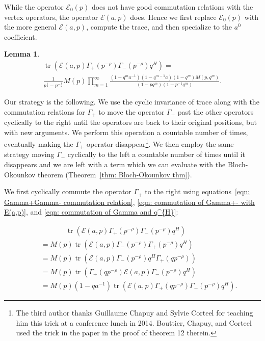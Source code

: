 \documentclass[12pt]{amsart}
\newcommand{\half}{\frac{1}{2}}
\newtheorem{lemma}[theorem]{Lemma}
\theoremstyle{definition}
\newcommand{\tr}{\operatorname{tr}}
\newcommand{\E}{\mathcal{E}}
\newcommand{\ptotheminusrho}{p^{-\rho}}
\begin{document}
While the operator $\E_{0}(p)$ does not have good commutation
relations with the vertex operators, the operator $\E (a,p)$
does. Hence we first replace $\E_{0}(p)$ with the more general $\E
(a,p)$, compute the trace, and then specialize to the $a^{0}$
coefficient.
\begin{lemma}\label{lem: trace of E Gamma+Gamma-q^{H}}
\begin{multline*}
\tr \left(\E (a,p)\Gamma_{+}(\ptotheminusrho )\Gamma_{-}(\ptotheminusrho )q^{H}
\right) = \\
\frac{1}{p^{\half}-p^{-\half}}M(p)\prod_{m=1}^{\infty}
\frac{(1-q^{m}a^{-1})(1-q^{m-1}a)(1-q^{m})
M(p,q^{m})}{(1-pq^{m})(1-p^{-1}q^{m})}.
\end{multline*}
\end{lemma}
\proof Our strategy is the following. We use the cyclic invariance of
trace along with the commutation relations for $\Gamma_{+}$ to move
the operator $\Gamma_{+}$ past the other operators cyclically to the
right until the operators are back to their original positions, but
with new arguments. We perform this operation a countable number of
times, eventually making the $\Gamma_{+}$ operator
disappear\footnote{The third author thanks Guillaume Chapuy and Sylvie
Corteel for teaching him this trick at a conference lunch in
2014. Bouttier, Chapuy, and Corteel used the trick in the paper
\cite{Bouttier-Chapuy-Corteel} in the proof of theorem 12
therein.}. We then employ the same strategy moving $\Gamma_{-}$
cyclically to the left a countable number of times until it disappears
and we are left with a term which we can evaluate with the
Bloch-Okounkov theorem (Theorem~\ref{thm: Bloch-Okounkov thm}).

We first cyclically commute the operator $\Gamma_{+}$ to the right
using equations~\eqref{eqn: Gamma+Gamma- commutation relation},
\eqref{eqn: commutation of Gamma+- with E(a,p)}, and \eqref{eqn:
commutation of Gamma and q^{H}}:

\begin{align*}
\quad &\quad \quad \quad \,\,\, \tr (\E (a,p)\Gamma_{+}(\ptotheminusrho)\Gamma_{-}(\ptotheminusrho
)q^{H})\\
& = M(p)\tr (\E (a,p)\Gamma_{-}(\ptotheminusrho)\Gamma_{+}(\ptotheminusrho
)q^{H})\\
& = M(p)\tr (\E (a,p)\Gamma_{-}(\ptotheminusrho)q^{H}\Gamma_{+}(q\ptotheminusrho
))\\
& = M(p)\tr (\Gamma_{+}(q\ptotheminusrho
)\E (a,p)\Gamma_{-}(\ptotheminusrho)q^{H})\\
& = M(p)(1-qa^{-1})\tr (\E (a,p)\Gamma_{+}(q\ptotheminusrho) \Gamma_{-}(\ptotheminusrho)q^{H}).
\end{align*}
\end{document}
